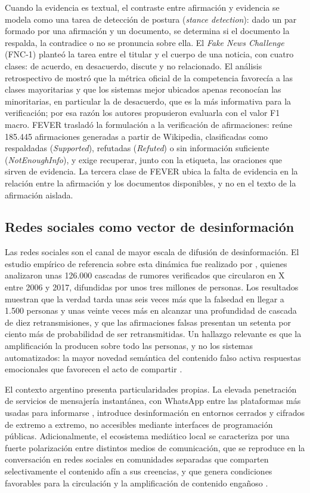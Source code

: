 Cuando la evidencia es textual, el contraste entre afirmación y evidencia se modela como una tarea de detección de postura (\textit{stance detection}): dado un par formado por una afirmación y un documento, se determina si el documento la respalda, la contradice o no se pronuncia sobre ella. El \textit{Fake News Challenge} (FNC-1) planteó la tarea entre el titular y el cuerpo de una noticia, con cuatro clases: de acuerdo, en desacuerdo, discute y no relacionado. El análisis retrospectivo de \textcite{HanselowskiEtAl2018} mostró que la métrica oficial de la competencia favorecía a las clases mayoritarias y que los sistemas mejor ubicados apenas reconocían las minoritarias, en particular la de desacuerdo, que es la más informativa para la verificación; por esa razón los autores propusieron evaluarla con el valor F1 macro. FEVER \parencite{ThorneEtAl2018} trasladó la formulación a la verificación de afirmaciones: reúne 185.445 afirmaciones generadas a partir de Wikipedia, clasificadas como respaldadas (\textit{Supported}), refutadas (\textit{Refuted}) o sin información suficiente (\textit{NotEnoughInfo}), y exige recuperar, junto con la etiqueta, las oraciones que sirven de evidencia. La tercera clase de FEVER ubica la falta de evidencia en la relación entre la afirmación y los documentos disponibles, y no en el texto de la afirmación aislada.

\subsection{Redes sociales como vector de desinformación}

Las redes sociales son el canal de mayor escala de difusión de desinformación. El estudio empírico de referencia sobre esta dinámica fue realizado por \textcite{VosoughiEtAl2018}, quienes analizaron unas 126.000 cascadas de rumores verificados que circularon en X entre 2006 y 2017, difundidas por unos tres millones de personas. Los resultados muestran que la verdad tarda unas seis veces más que la falsedad en llegar a 1.500 personas y unas veinte veces más en alcanzar una profundidad de cascada de diez retransmisiones, y que las afirmaciones falsas presentan un setenta por ciento más de probabilidad de ser retransmitidas. Un hallazgo relevante es que la amplificación la producen sobre todo las personas, y no los sistemas automatizados: la mayor novedad semántica del contenido falso activa respuestas emocionales que favorecen el acto de compartir \parencite{VosoughiEtAl2018}.

El contexto argentino presenta particularidades propias. La elevada penetración de servicios de mensajería instantánea, con WhatsApp entre las plataformas más usadas para informarse \parencite{Newman2024}, introduce desinformación en entornos cerrados y cifrados de extremo a extremo, no accesibles mediante interfaces de programación públicas. Adicionalmente, el ecosistema mediático local se caracteriza por una fuerte polarización entre distintos medios de comunicación, que se reproduce en la conversación en redes sociales en comunidades separadas que comparten selectivamente el contenido afín a sus creencias, y que genera condiciones favorables para la circulación y la amplificación de contenido engañoso \parencite{CalvoAruguete2020}.

